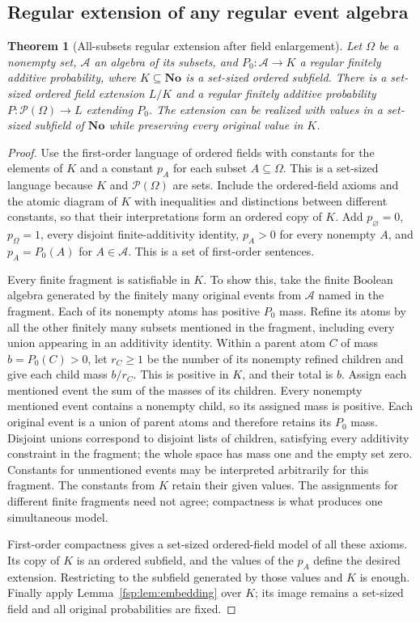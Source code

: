 \documentclass[11pt,a4paper]{article}
\numberwithin{equation}{section}
\newtheorem{theorem}{Theorem}[section]
\theoremstyle{definition}
\theoremstyle{remark}
\newcommand{\No}{\mathbf{No}}
\newcommand{\A}{\mathcal A}
\begin{document}
\subsection{Regular extension of any regular event algebra}

\begin{theorem}[All-subsets regular extension after field enlargement]
\label{fsp:thm:extension}
Let $\Omega$ be a nonempty set, $\A$ an algebra of its subsets, and
$P_0:\A\to K$ a regular finitely additive probability, where
$K\subseteq\No$ is a set-sized ordered subfield. There is a set-sized ordered field
extension $L/K$ and a regular finitely additive probability
$P:\mathcal P(\Omega)\to L$ extending $P_0$.
The extension can be realized with values in a set-sized subfield of
$\No$ while preserving every original value in $K$.
\end{theorem}
\begin{proof}
Use the first-order language of ordered fields with constants for the
elements of $K$ and a constant $p_A$ for each subset $A\subseteq\Omega$.
This is a set-sized language because $K$ and $\mathcal P(\Omega)$
are sets. Include the ordered-field axioms and the atomic diagram of
$K$ with inequalities and distinctions between different constants, so
that their interpretations form an ordered copy of $K$. Add
$p_\varnothing=0$, $p_\Omega=1$, every disjoint finite-additivity
identity, $p_A>0$ for every nonempty $A$, and
$p_A=P_0(A)$ for $A\in\A$. This is a set of first-order sentences.

Every finite fragment is satisfiable in $K$. To show this, take the
finite Boolean algebra generated by the finitely many original events
from $\A$ named in the fragment. Each of its nonempty atoms has positive
$P_0$ mass. Refine its atoms by all the other finitely many subsets
mentioned in the fragment, including every union appearing in an
additivity identity. Within a parent atom $C$ of mass $b=P_0(C)>0$,
let $r_C\ge1$ be the number of its nonempty refined children and give
each child mass $b/r_C$. This is positive in $K$, and their total is
$b$. Assign each mentioned event the sum of the masses of its children.
Every nonempty mentioned event contains a nonempty child, so its assigned
mass is positive. Each original event is a union of parent atoms and
therefore retains its $P_0$ mass. Disjoint unions correspond to disjoint
lists of children, satisfying every additivity constraint in the fragment;
the whole space has mass one and the empty set zero. Constants for
unmentioned events may be interpreted arbitrarily for this fragment.
The constants from $K$ retain their given values. The assignments for
different finite fragments need not agree; compactness is what produces
one simultaneous model.

First-order compactness gives a set-sized ordered-field model of all
these axioms. Its copy of $K$ is an ordered subfield, and the values of
the $p_A$ define the desired extension. Restricting to the subfield
generated by those values and $K$ is enough. Finally apply
Lemma~\ref{fsp:lem:embedding} over $K$; its image remains a set-sized field
and all original probabilities are fixed.
\end{proof}
\end{document}
